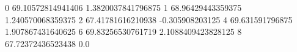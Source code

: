 0 69.10572814941406 1.3820037841796875
1 68.96429443359375 1.240570068359375
2 67.41781616210938 -0.305908203125
4 69.631591796875 1.907867431640625
6 69.83256530761719 2.1088409423828125
8 67.72372436523438 0.0
